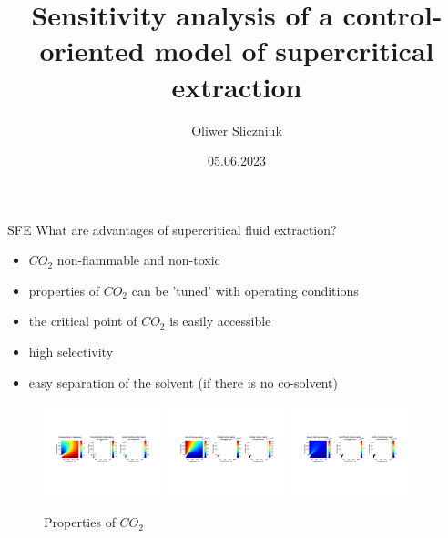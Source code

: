 \documentclass[8pt]{beamer}
\title{Sensitivity analysis of a control-oriented model of supercritical extraction}
\subtitle{}
\date{05.06.2023}
\author{Oliwer Sliczniuk}
\institute{Aalto University, Finland}
\begin{document}
	
	\begin{frame}
		\titlepage 
	\end{frame}
	

	\begin{frame}[fragile]{SFE}
		What are advantages of supercritical fluid extraction?
		\begin{itemize}
			\item $CO_2$ non-flammable and non-toxic
			\item properties of $CO_2$ can be 'tuned' with operating conditions
			\item the critical point of $CO_2$ is easily accessible 
			\item high selectivity
			\item easy separation of the solvent (if there is no co-solvent)
		\end{itemize}
	
		\begin{figure}[!h]
			\centering
			\includegraphics[trim = 2.5cm 8cm 18cm 7cm,clip,width=0.31\textwidth]{Figures/Compressibility.pdf}
			\includegraphics[trim = 2.5cm 8cm 18cm 7cm,clip,width=0.31\textwidth]{Figures/RHO.pdf}
			\includegraphics[trim = 2.5cm 8cm 18cm 7cm,clip,width=0.31\textwidth]{Figures/CP.pdf}
			\caption{Properties of $CO_2$}
			\label{fig:SFE_drawing}
		\end{figure} 
	
	\end{frame}
	
\end{document}
